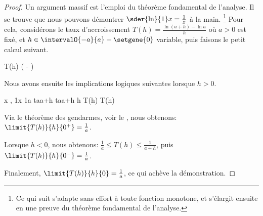 \begin{proof}
	Un argument massif est l'emploi du théorème fondamental de l'analyse.
	Il se trouve que nous pouvons démontrer $\sder{\ln}{1} x = \frac1x$ à la main.%
	\footnote{
		Ce qui suit s'adapte sans effort à toute fonction monotone, et s'élargit ensuite en une preuve du théorème fondamental de l'analyse.
	}
	Pour cela, considérons le taux d'accroissement $T(h) = \frac{\ln(a+h) - \ln a}{h}$ où $a > 0$ est fixé,
	et
	$h \in \intervalO{-a}{a} - \setgene{0}$ variable,
	puis
	faisons le petit calcul suivant.

	\begin{stepcalc}[style=sar]
		T(h)
	\explnext{}
		 \Big(
			 - 
		\Big)
		 
	\end{stepcalc}
	
	Nous avons ensuite les implications logiques suivantes lorsque $h > 0$.
	
	\begin{stepcalc}[style=ar*, ope=\implies]
	\explnext{}
		\forall x \in \intervalC{a}{a+h},
		 \leq \dfrac1x \leq \dfrac1a
		\leq {}      {t}{a}{a+h}
		\leq {}      {t}{a}{a+h}
	\explnext{}
	     \leq h T(h) \leq {}
		 \leq T(h)\leq {}
	\end{stepcalc}
	
	Via le théorème des gendarmes, voir le , nous obtenons:
	$\limit{T(h)}{h}{0^+} = \frac1a$.

	Lorsque $h < 0$, nous obtenons:
	$\frac{1}{a} \leq T(h) \leq \frac{1}{a+h}$,
	puis
	$\limit{T(h)}{h}{0^-} = \frac1a$.
	
	Finalement,
	$\limit{T(h)}{h}{0} = \frac1a$, ce qui achève la démonstration.
\end{proof}
